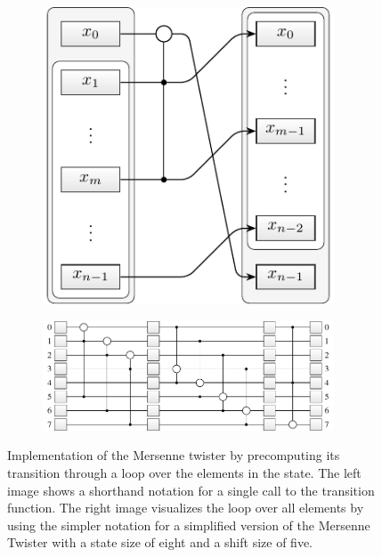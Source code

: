 \documentclass{stdlocal}
\begin{document}
    \begin{figure}
      \center
      \begin{subfigure}[b]{0.3\textwidth}
        \center
        \includegraphics[width=0.95\textwidth]{figures/mt19937_transition_short.pdf}
      \end{subfigure}
      \begin{subfigure}[b]{0.68\textwidth}
        \center
        \includegraphics[width=0.95\textwidth]{figures/mt19937_loop_scheme.pdf}
      \end{subfigure}
      \caption[Mersenne Twister Loop Scheme]{
        Implementation of the Mersenne twister by precomputing its transition through a loop over the elements in the state.
        The left image shows a shorthand notation for a single call to the transition function.
        The right image visualizes the loop over all elements by using the simpler notation for a simplified version of the Mersenne Twister with a state size of eight and a shift size of five.
      }
      \label{fig:mt-loop-scheme}
    \end{figure}
\end{document}
